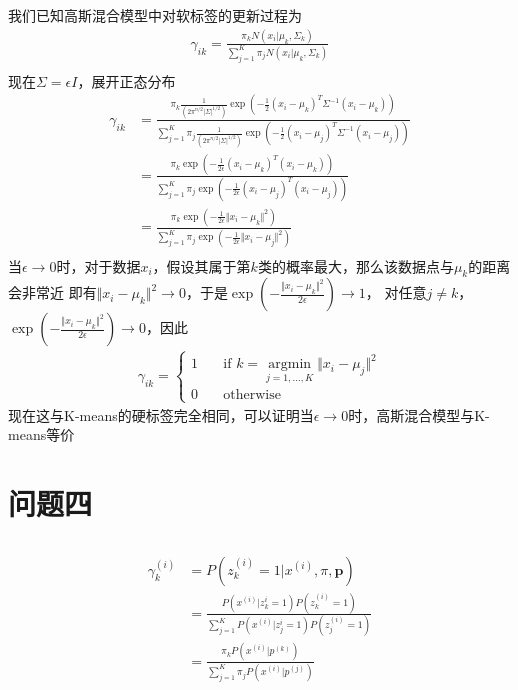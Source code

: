 \documentclass[12pt, a4paper]{article}
\begin{document}
我们已知高斯混合模型中对软标签的更新过程为
\begin{align*}
    \gamma_{ik}=\frac{\pi_k N(x_i\vert\mu_k,\Sigma_k)}{\sum_{j=1}^K \pi_j N(x_i\vert\mu_k,\Sigma_k)}\\
\end{align*}
现在$\Sigma=\epsilon I$，展开正态分布
\begin{align*}
    \gamma_{ik}&=\frac{\pi_k \frac{1}{(2\pi^{n/2}\vert\Sigma\vert^{1/2})}
    \exp(-\frac{1}{2}(x_i-\mu_k)^T\Sigma^{-1}(x_i-\mu_k))}
    {\sum_{j=1}^K \pi_j \frac{1}{(2\pi^{n/2}\vert\Sigma\vert^{1/2})}
    \exp(-\frac{1}{2}(x_i-\mu_j)^T\Sigma^{-1}(x_i-\mu_j))}\\
    &=\frac{\pi_k\exp(-\frac{1}{2\epsilon}(x_i-\mu_k)^T(x_i-\mu_k))}
    {\sum_{j=1}^{K}\pi_j\exp(-\frac{1}{2\epsilon}(x_i-\mu_j)^T(x_i-\mu_j))}\\
    &=\frac{\pi_k\exp(-\frac{1}{2\epsilon}\Vert x_i-\mu_k\Vert^2)}
    {\sum_{j=1}^{K}\pi_j\exp(-\frac{1}{2\epsilon}\Vert x_i-\mu_j\Vert^2)}\\
\end{align*}
当$\epsilon\rightarrow0$时，对于数据$x_i$，假设其属于第$k$类的概率最大，那么该数据点与$\mu_k$的距离会非常近
即有$\Vert x_i-\mu_k\Vert^2\rightarrow0$，于是$\exp(-\frac{\Vert x_i-\mu_k\Vert^2}{2\epsilon})\rightarrow1$，
对任意$j\neq k$，$\exp(-\frac{\Vert x_i-\mu_k\Vert^2}{2\epsilon})\rightarrow0$，因此
\begin{align*}
    \gamma_{ik}=\left\{
        \begin{aligned}
            1 & \quad\text{if }k=\mathop{argmin}\limits_{j=1,\dots,K}\Vert x_i-\mu_j \Vert^2\\
            0 & \quad\text{otherwise}
        \end{aligned}
    \right.
\end{align*}
现在这与K-means的硬标签完全相同，可以证明当$\epsilon\rightarrow0$时，高斯混合模型与K-means等价

\section{问题四}

\subsection{}

\begin{align*}
    \gamma_k^{(i)}&=P(z_k^{(i)}=1\vert x^{(i)},\pi,\mathbf{p})\\
    &=\frac{P(x^{(i)}\vert z_k^{i}=1)P(z_k^{(i)}=1)}{\sum_{j=1}^KP(x^{(i)}\vert z_j^{i}=1)P(z_j^{(i)}=1)}\\
    &=\frac{\pi_k P(x^{(i)}\vert p^{(k)})}{\sum_{j=1}^K\pi_j P(x^{(i)}\vert p^{(j)})}
\end{align*}
\end{document}
